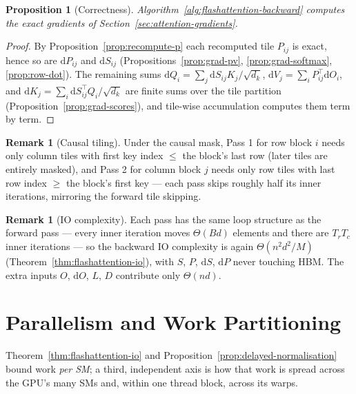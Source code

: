 \documentclass[11pt]{amsart}
\theoremstyle{plain}
\newtheorem{proposition}[theorem]{Proposition}
\theoremstyle{definition}
\newtheorem{remark}[theorem]{Remark}
\begin{document}
\begin{proposition}[Correctness]
\label{prop:backward-correct}
Algorithm~\ref{alg:flashattention-backward} computes the exact gradients of
Section~\ref{sec:attention-gradients}.
\end{proposition}
\begin{proof}
By Proposition~\ref{prop:recompute-p} each recomputed tile $P_{ij}$ is
exact, hence so are $\mathrm{d}P_{ij}$ and $\mathrm{d}S_{ij}$
(Propositions~\ref{prop:grad-pv}, \ref{prop:grad-softmax},
\ref{prop:row-dot}).  The remaining sums
$\mathrm{d}Q_i = \sum_j \mathrm{d}S_{ij} K_j/\sqrt{d_k}$,
$\mathrm{d}V_j = \sum_i P_{ij}^\top \mathrm{d}O_i$, and
$\mathrm{d}K_j = \sum_i \mathrm{d}S_{ij}^\top Q_i/\sqrt{d_k}$ are finite
sums over the tile partition (Proposition~\ref{prop:grad-scores}), and
tile-wise accumulation computes them term by term.
\end{proof}

\begin{remark}[Causal tiling]
Under the causal mask, Pass 1 for row block $i$ needs only column tiles
with first key index $\leq$ the block's last row (later tiles are entirely
masked), and Pass 2 for column block $j$ needs only row tiles with last row
index $\geq$ the block's first key — each pass skips roughly half its inner
iterations, mirroring the forward tile skipping.
\end{remark}

\begin{remark}[IO complexity]
Each pass has the same loop structure as the forward pass — every inner
iteration moves $\Theta(B d)$ elements and there are $T_r T_c$ inner
iterations — so the backward IO complexity is again
$\Theta(n^2 d^2 / M)$ (Theorem~\ref{thm:flashattention-io}), with $S$,
$P$, $\mathrm{d}S$, $\mathrm{d}P$ never touching HBM.  The extra inputs
$O$, $\mathrm{d}O$, $L$, $D$ contribute only $\Theta(nd)$.
\end{remark}

\section{Parallelism and Work Partitioning}
\label{sec:flash2-parallelism}

Theorem~\ref{thm:flashattention-io} and Proposition~\ref{prop:delayed-normalisation}
bound work \emph{per SM}; a third, independent axis is how that work is
spread across the GPU's many SMs and, within one thread block, across its
warps.
\end{document}
